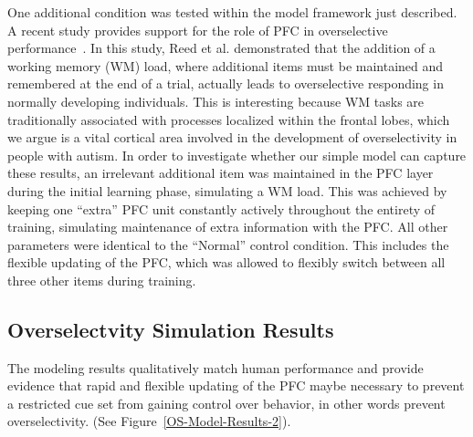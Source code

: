 One additional condition was tested within the model framework just described.  A recent study provides support for the role of PFC in overselective performance~\cite{ReedP:2005:TaskLoad}.  In this study, Reed et al. demonstrated that the addition of a working memory (WM) load, where additional items must be maintained and remembered at the end of a trial, actually leads to overselective responding in normally developing individuals.  This is interesting because WM tasks are traditionally associated with processes localized within the frontal lobes, which we argue is a vital cortical area involved in the development of overselectivity in people with autism.  In order to investigate whether our simple model can capture these results, an irrelevant additional item was maintained in the PFC layer during the initial learning phase, simulating a WM load.  This was achieved by keeping one ``extra'' PFC unit constantly actively throughout the entirety of training, simulating maintenance of extra information with the PFC.  All other parameters were identical to the ``Normal'' control condition.  This includes the flexible updating of the PFC, which  was allowed to flexibly switch between all three other items during training.

\subsection{Overselectvity Simulation Results}
The modeling results qualitatively match human performance and provide evidence that rapid and flexible updating of the PFC maybe necessary to prevent a restricted cue set from gaining control over behavior, in other words prevent overselectivity. (See Figure~\ref{OS-Model-Results-2}).  

